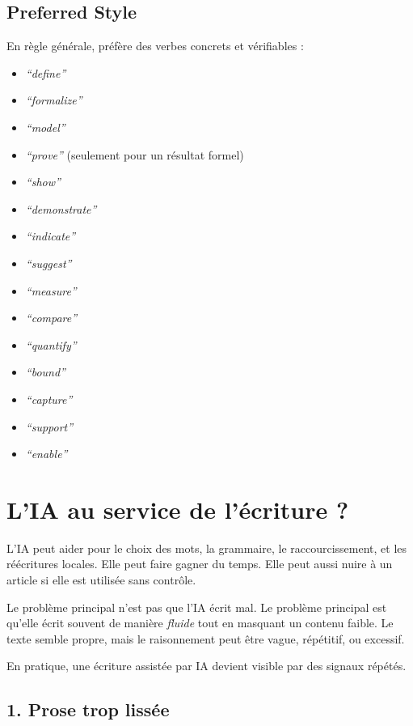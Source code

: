\documentclass[11pt,a4paper]{article}
\theoremstyle{definition}
\begin{document}
\subsection*{Preferred Style}

En règle générale, préfère des verbes concrets et vérifiables :
\begin{itemize}
    \item \textit{``define''}
    \item \textit{``formalize''}
    \item \textit{``model''}
    \item \textit{``prove''} (seulement pour un résultat formel)
    \item \textit{``show''}
    \item \textit{``demonstrate''}
    \item \textit{``indicate''}
    \item \textit{``suggest''}
    \item \textit{``measure''}
    \item \textit{``compare''}
    \item \textit{``quantify''}
    \item \textit{``bound''}
    \item \textit{``capture''}
    \item \textit{``support''}
    \item \textit{``enable''}
\end{itemize}


\section{L'IA au service de l'écriture ?}

L'IA peut aider pour le choix des mots, la grammaire, le raccourcissement, et les réécritures locales. Elle peut faire gagner du temps. Elle peut aussi nuire à un article si elle est utilisée sans contrôle.

Le problème principal n'est pas que l'IA écrit mal. Le problème principal est qu'elle écrit souvent de manière \emph{fluide} tout en masquant un contenu faible. Le texte semble propre, mais le raisonnement peut être vague, répétitif, ou excessif.

En pratique, une écriture assistée par IA devient visible par des signaux répétés.

\subsection*{1. Prose trop lissée}
\end{document}

